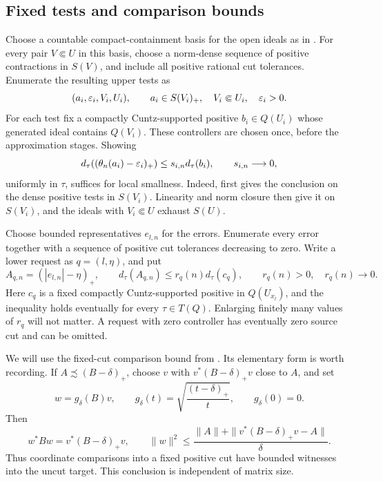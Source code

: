 \subsection{Fixed tests and comparison bounds}

Choose a countable compact-containment basis for the open ideals
as in .  For every pair \(V\Subset U\) in this
basis, choose a norm-dense sequence of positive contractions in
\(S(V)\), and include all positive rational cut tolerances.
Enumerate the resulting upper tests as
\begin{equation}\label{sm:upper-tests}
 (a_i,\varepsilon_i,V_i,U_i),\qquad
 a_i\in S(V_i)_+,\quad V_i\Subset U_i,
 \quad \varepsilon_i>0.
\end{equation}
For each test fix a compactly Cuntz-supported positive
\(b_i\in Q(U_i)\) whose generated ideal contains \(Q(V_i)\).
These controllers are chosen once, before the approximation
stages.  Showing
\begin{equation}\label{sm:upper-goal}
 d_\tau((\theta_n(a_i)-\varepsilon_i)_+)
 \leq s_{i,n}d_\tau(b_i),
 \qquad s_{i,n}\longrightarrow0,
\end{equation}
uniformly in \(\tau\), suffices for local smallness.
Indeed,  first gives the conclusion
on the dense positive tests in \(S(V_i)\).  Linearity and norm
closure then give it on \(S(V_i)\), and the ideals with
\(V_i\Subset U\) exhaust \(S(U)\).

Choose bounded representatives \(e_{l,n}\) for the errors.
Enumerate every error together with a sequence of positive cut
tolerances decreasing to zero.  Write a lower request as
\(q=(l,\eta)\), and put
\begin{equation}\label{sm:error-controllers}
 A_{q,n}=(|e_{l,n}|-\eta)_+,
 \qquad
 d_\tau(A_{q,n})\leq r_q(n)d_\tau(c_q),
 \qquad r_q(n)>0,\quad r_q(n)\longrightarrow0.
\end{equation}
Here \(c_q\) is a fixed compactly Cuntz-supported positive
in \(Q(U_{x_l})\), and the inequality holds eventually for
every \(\tau\in T(Q)\).  Enlarging finitely many values of
\(r_q\) will not matter.  A request with zero controller has
eventually zero source cut and can be omitted.

We will use the fixed-cut comparison bound from
.  Its elementary form is worth recording.
If \(A\precsim(B-\delta)_+\), choose \(v\) with
\(v^*(B-\delta)_+v\) close to \(A\), and set
\[
 w=g_\delta(B)v,
 \qquad
 g_\delta(t)=\sqrt{\frac{(t-\delta)_+}{t}},
 \qquad g_\delta(0)=0.
\]
Then
\begin{equation}\label{sm:witness-bound}
 w^*Bw=v^*(B-\delta)_+v,
 \qquad
 \|w\|^2\leq
 \frac{\|A\|+\|v^*(B-\delta)_+v-A\|}{\delta}.
\end{equation}
Thus coordinate comparisons into a fixed positive cut have
bounded witnesses into the uncut target.  This conclusion is
independent of matrix size.

